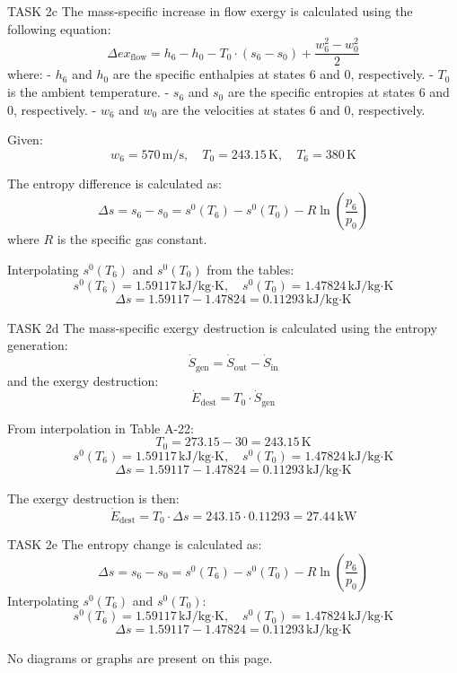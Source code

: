 TASK 2c  
The mass-specific increase in flow exergy is calculated using the following equation:  
\[
\Delta ex_{\text{flow}} = h_6 - h_0 - T_0 \cdot (s_6 - s_0) + \frac{w_6^2 - w_0^2}{2}
\]  
where:  
- \( h_6 \) and \( h_0 \) are the specific enthalpies at states 6 and 0, respectively.  
- \( T_0 \) is the ambient temperature.  
- \( s_6 \) and \( s_0 \) are the specific entropies at states 6 and 0, respectively.  
- \( w_6 \) and \( w_0 \) are the velocities at states 6 and 0, respectively.  

Given:  
\[
w_6 = 570 \, \text{m/s}, \quad T_0 = 243.15 \, \text{K}, \quad T_6 = 380 \, \text{K}
\]  

The entropy difference is calculated as:  
\[
\Delta s = s_6 - s_0 = s^0(T_6) - s^0(T_0) - R \ln \left(\frac{p_6}{p_0}\right)
\]  
where \( R \) is the specific gas constant.  

Interpolating \( s^0(T_6) \) and \( s^0(T_0) \) from the tables:  
\[
s^0(T_6) = 1.59117 \, \text{kJ/kg·K}, \quad s^0(T_0) = 1.47824 \, \text{kJ/kg·K}
\]  
\[
\Delta s = 1.59117 - 1.47824 = 0.11293 \, \text{kJ/kg·K}
\]  

TASK 2d  
The mass-specific exergy destruction is calculated using the entropy generation:  
\[
\dot{S}_{\text{gen}} = \dot{S}_{\text{out}} - \dot{S}_{\text{in}}
\]  
and the exergy destruction:  
\[
\dot{E}_{\text{dest}} = T_0 \cdot \dot{S}_{\text{gen}}
\]  

From interpolation in Table A-22:  
\[
T_0 = 273.15 - 30 = 243.15 \, \text{K}
\]  
\[
s^0(T_6) = 1.59117 \, \text{kJ/kg·K}, \quad s^0(T_0) = 1.47824 \, \text{kJ/kg·K}
\]  
\[
\Delta s = 1.59117 - 1.47824 = 0.11293 \, \text{kJ/kg·K}
\]  

The exergy destruction is then:  
\[
\dot{E}_{\text{dest}} = T_0 \cdot \Delta s = 243.15 \cdot 0.11293 = 27.44 \, \text{kW}
\]  

TASK 2e  
The entropy change is calculated as:  
\[
\Delta s = s_6 - s_0 = s^0(T_6) - s^0(T_0) - R \ln \left(\frac{p_6}{p_0}\right)
\]  
Interpolating \( s^0(T_6) \) and \( s^0(T_0) \):  
\[
s^0(T_6) = 1.59117 \, \text{kJ/kg·K}, \quad s^0(T_0) = 1.47824 \, \text{kJ/kg·K}
\]  
\[
\Delta s = 1.59117 - 1.47824 = 0.11293 \, \text{kJ/kg·K}
\]  

No diagrams or graphs are present on this page.
